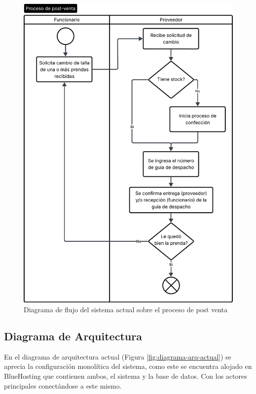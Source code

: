 \begin{figure}[htbp]
    \centering
    \includegraphics[height=0.9\textheight]{figuras/diagramas-actuales/diagrama-flujo-actual-post-venta.png}
    \caption{Diagrama de flujo del sistema actual sobre el proceso de post venta}
    \label{fig:diagrama-flujo-actual-post-venta}
\end{figure}

\subsection{Diagrama de Arquitectura}

En el diagrama de arquitectura actual (Figura \ref{fig:diagrama-arq-actual}) se aprecia la configuración monolítica del sistema, como este se encuentra alojado en BlueHosting que contienen ambos, el sistema y la base de datos. Con los actores principales conectándose a este mismo.

